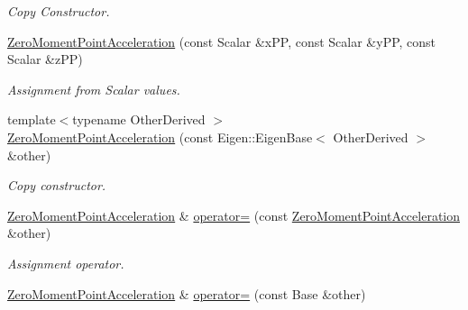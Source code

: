 \begin{DoxyCompactItemize}
\begin{DoxyCompactList}\small\item\em Copy Constructor. \end{DoxyCompactList}\item 
\hyperlink{classow__core_1_1ZeroMomentPointAcceleration_abc806bec8bdcb5cc362bf2cd28753e7f}{Zero\+Moment\+Point\+Acceleration} (const Scalar \&x\+PP, const Scalar \&y\+PP, const Scalar \&z\+PP)\hypertarget{classow__core_1_1ZeroMomentPointAcceleration_abc806bec8bdcb5cc362bf2cd28753e7f}{}\label{classow__core_1_1ZeroMomentPointAcceleration_abc806bec8bdcb5cc362bf2cd28753e7f}

\begin{DoxyCompactList}\small\item\em Assignment from Scalar values. \end{DoxyCompactList}\item 
{\footnotesize template$<$typename Other\+Derived $>$ }\\\hyperlink{classow__core_1_1ZeroMomentPointAcceleration_a5545a5a437c09bd9a6cfe2e25f8d9247}{Zero\+Moment\+Point\+Acceleration} (const Eigen\+::\+Eigen\+Base$<$ Other\+Derived $>$ \&other)
\begin{DoxyCompactList}\small\item\em Copy constructor. \end{DoxyCompactList}\item 
\hyperlink{classow__core_1_1ZeroMomentPointAcceleration}{Zero\+Moment\+Point\+Acceleration} \& \hyperlink{classow__core_1_1ZeroMomentPointAcceleration_a26dca9b77da27cdf400ce234edbef3e8}{operator=} (const \hyperlink{classow__core_1_1ZeroMomentPointAcceleration}{Zero\+Moment\+Point\+Acceleration} \&other)\hypertarget{classow__core_1_1ZeroMomentPointAcceleration_a26dca9b77da27cdf400ce234edbef3e8}{}\label{classow__core_1_1ZeroMomentPointAcceleration_a26dca9b77da27cdf400ce234edbef3e8}

\begin{DoxyCompactList}\small\item\em Assignment operator. \end{DoxyCompactList}\item 
\hyperlink{classow__core_1_1ZeroMomentPointAcceleration}{Zero\+Moment\+Point\+Acceleration} \& \hyperlink{classow__core_1_1ZeroMomentPointAcceleration_aea0e202dc307a26f8f8442aa77d3123b}{operator=} (const Base \&other)\hypertarget{classow__core_1_1ZeroMomentPointAcceleration_aea0e202dc307a26f8f8442aa77d3123b}{}\label{classow__core_1_1ZeroMomentPointAcceleration_aea0e202dc307a26f8f8442aa77d3123b}


\end{DoxyCompactItemize}
